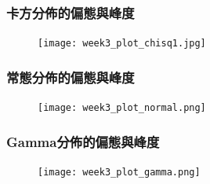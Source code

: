 \documentclass{beamer}
\begin{document}
\begin{frame}\frametitle{卡方分佈的偏態與峰度}
\begin{figure}
\begin{center}
\texttt{[image: week3\_plot\_chisq1.jpg]}
\end{center}
\end{figure}
\end{frame}
\begin{frame}\frametitle{常態分佈的偏態與峰度}
\begin{figure}
\begin{center}
\texttt{[image: week3\_plot\_normal.png]}
\end{center}
\end{figure}
\end{frame}
\begin{frame}\frametitle{Gamma分佈的偏態與峰度}
\begin{figure}
\begin{center}
\texttt{[image: week3\_plot\_gamma.png]}
\end{center}
\end{figure}
\end{frame}
\end{document}
